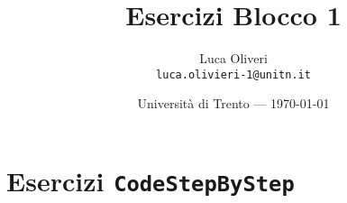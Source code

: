 \documentclass{article}
\title{Esercizi Blocco 1} %
\author{Luca Oliveri\\ \texttt{luca.olivieri-1@unitn.it}} %
\date{Università di Trento --- \today} %
\begin{document}
\maketitle %


\setcounter{section}{2}


\subsection{} 


\section*{Esercizi \texttt{CodeStepByStep}}
\begin{itemize}

\end{itemize}
\end{document}

